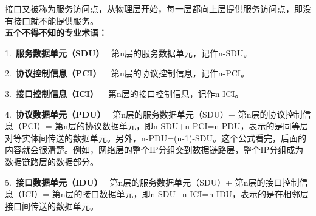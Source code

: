 接口又被称为服务访问点，从物理层开始，每一层都向上层提供服务访问点，即没有接口就不能提供服务。\\

{\textbf{五个不得不知的专业术语：}}

1.~\textbf{服务数据单元（SDU）} ~第n层的服务数据单元，记作n-SDU。

2.~\textbf{协议控制信息（PCI）} ~ 第n层的协议控制信息，记作n-PCI。

3.~\textbf{接口控制信息（ICI）} ~ 第n层的接口控制信息，记作n-ICI。

4.~\textbf{协议数据单元（PDU）} ~第n层的服务数据单元（SDU）+
第n层的协议控制信息（PCI）=
第n层的协议数据单元，即n-SDU+n-PCI=n-PDU，表示的是同等层对等实体间传送的数据单元。另外，n-PDU=(n-1)-SDU。这个公式看完，后面的内容就会很清楚。例如，网络层的整个IP分组交到数据链路层，整个IP分组成为数据链路层的数据部分。

5.~\textbf{接口数据单元（IDU）} ~第n层的服务数据单元（SDU）+
第n层的接口控制信息（ICI）=
第n层的接口数据单元，即n-SDU+n-ICI=n-IDU，表示的是在相邻层接口间传送的数据单元。\\
